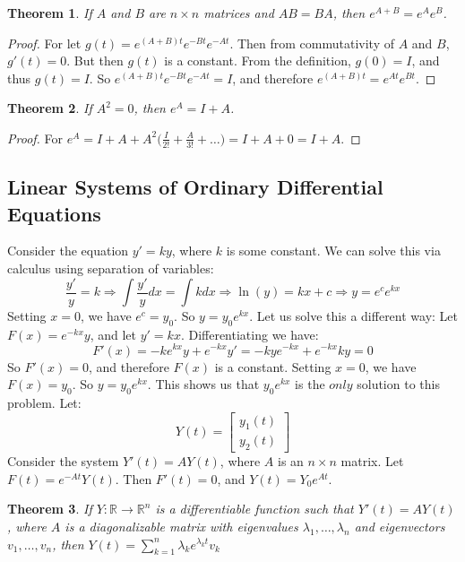 \documentclass[oneside]{book}
\theoremstyle{mystyle}
\newtheorem{theorem}{Theorem}[section]
\begin{document}
\begin{theorem}
If $A$ and $B$ are $n\times n$ matrices and $AB=BA$, then $e^{A+B} = e^{A}e^{B}$.
\end{theorem}
\begin{proof}
For let $g(t) = e^{(A+B)t}e^{-Bt}e^{-At}$. Then from commutativity of $A$ and $B$, $g'(t) = 0$. But then $g(t)$ is a constant. From the definition, $g(0) = I$, and thus $g(t) = I$. So $e^{(A+B)t}e^{-Bt}e^{-At} = I$, and therefore $e^{(A+B)t} = e^{At}e^{Bt}$.
\end{proof}
\begin{theorem}
If $A^{2} = 0$, then $e^{A} = I+A$.
\end{theorem}
\begin{proof}
For $e^{A} = I+A+A^{2}\big(\frac{I}{2!}+\frac{A}{3!}+\hdots\big) = I+A+0 = I+A$.
\end{proof}
\subsection{Linear Systems of Ordinary Differential Equations}
Consider the equation $y' = ky$, where $k$ is some constant. We can solve this via calculus using separation of variables:
\begin{equation*}
    \frac{y'}{y} = k\Rightarrow \int \frac{y'}{y}dx = \int kdx \Rightarrow \ln(y) = kx+c \Rightarrow y = e^c e^{kx}    
\end{equation*}
Setting $x=0$, we have $e^c = y_0$. So $y = y_0e^{kx}$. Let us solve this a different way: Let $F(x) = e^{-kx}y$, and let $y'=kx$. Differentiating we have:
\begin{equation*}
    F'(x)=-ke^{kx}y+e^{-kx}y'=-kye^{-kx}+e^{-kx}ky=0    
\end{equation*}
So $F'(x) = 0$, and therefore $F(x)$ is a constant. Setting $x=0$, we have $F(x) = y_0$. So $y = y_0e^{kx}$. This shows us that $y_0e^{kx}$ is the $only$ solution to this problem. Let:
\begin{equation*}
    Y(t) = \begin{bmatrix} y_1(t) \\ y_2(t)\end{bmatrix}    
\end{equation*}
Consider the system $Y'(t) = AY(t)$, where $A$ is an $n\times n$ matrix. Let $F(t) = e^{-At}Y(t)$. Then $F'(t) = 0$, and $Y(t) = Y_0 e^{At}$.
\begin{theorem}
If $Y:\mathbb{R}\rightarrow \mathbb{R}^n$ is a differentiable function such that $Y'(t) = AY(t)$, where $A$ is a diagonalizable matrix with eigenvalues $\lambda_1,\hdots, \lambda_n$ and eigenvectors $v_1,\hdots, v_n$, then $Y(t) = \sum_{k=1}^{n} \lambda_k e^{\lambda_k t}v_k$
\end{theorem}
\end{document}
